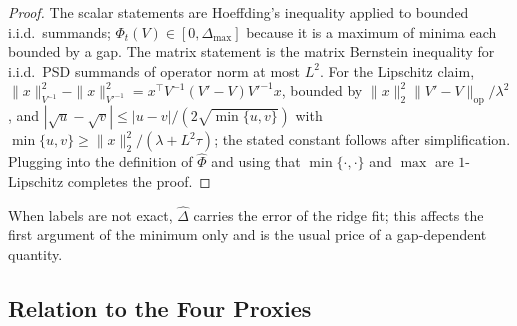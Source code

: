 \documentclass{article}
\theoremstyle{definition}
\theoremstyle{remark}
\theoremstyle{remark}
\begin{document}
\begin{proof}
The scalar statements are Hoeffding's inequality applied to bounded i.i.d.\
summands; $\Phi_t(V)\in[0,\Delta_{\max}]$ because it is a maximum of minima
each bounded by a gap. The matrix statement is the matrix Bernstein inequality
for i.i.d.\ PSD summands of operator norm at most $L^2$. For the Lipschitz
claim, $\|x\|^2_{V^{-1}}-\|x\|^2_{V'^{-1}}=x^\top V^{-1}(V'-V)V'^{-1}x$, bounded by
$\|x\|_2^2\|V'-V\|_{\mathrm{op}}/\lambda^2$, and $|\sqrt u-\sqrt v|\le|u-v|/(2\sqrt{\min\{u,v\}})$
with $\min\{u,v\}\ge\|x\|_2^2/(\lambda+L^2\tau)$; the stated constant follows
after simplification. Plugging into the definition of $\widehat\Phi$ and
using that $\min\{\cdot,\cdot\}$ and $\max$ are $1$-Lipschitz completes the
proof.
\end{proof}

When labels are not exact, $\widehat\Delta$ carries the error of the ridge
fit; this affects the first argument of the minimum only and is the usual
price of a gap-dependent quantity.

\subsection{Relation to the Four Proxies}
\label{app:proxies}
\end{document}
